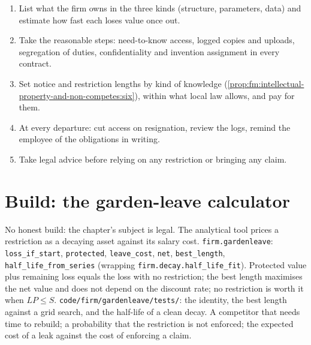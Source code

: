 \begin{method}\label{met:fm:intellectual-property-and-non-competes:protect}
\begin{enumerate}
\item List what the firm owns in the three kinds (structure, parameters, data) and estimate how fast each loses value once out.
\item Take the reasonable steps: need-to-know access, logged copies and uploads, segregation of duties, confidentiality and invention
assignment in every contract.
\item Set notice and restriction lengths by kind of knowledge (\cref{prop:fm:intellectual-property-and-non-competes:six}), within what local law
allows, and pay for them.
\item At every departure: cut access on resignation, review the logs, remind the employee of the obligations in writing.
\item Take legal advice before relying on any restriction or bringing any claim.
\end{enumerate}
\end{method}

\section{Build: the garden-leave calculator}\label{bld:fm:intellectual-property-and-non-competes:gardenleave}

\begin{build}
 No honest build: the chapter's subject is legal. The analytical tool prices a restriction as a decaying asset against its salary
cost.
 \texttt{firm.gardenleave}: \texttt{loss\_if\_start}, \texttt{protected}, \texttt{leave\_cost}, \texttt{net}, \texttt{best\_length},
\texttt{half\_life\_from\_series} (wrapping \texttt{firm.decay.half\_life\_fit}).
 Protected value plus remaining loss equals the loss with no restriction; the best length maximises the net value and does not depend
on the discount rate; no restriction is worth it when $LP\le S$.
 \texttt{code/firm/gardenleave/tests/}: the identity, the best length against a grid search, and the half-life of a clean
decay.
 A competitor that needs time to rebuild; a probability that the restriction is not enforced; the expected cost of a leak against
the cost of enforcing a claim.
\end{build}

